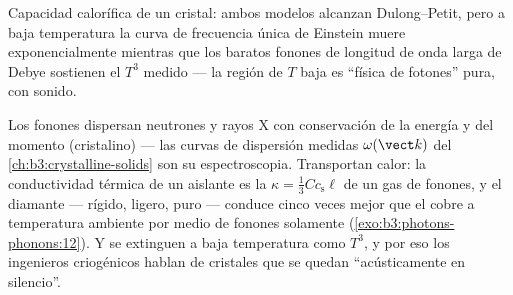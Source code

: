 \begin{omfigure}

{\small Capacidad calorífica de un cristal: ambos modelos alcanzan
Dulong--Petit, pero a baja temperatura la curva de frecuencia única de
Einstein muere exponencialmente mientras que los baratos fonones de longitud
de onda larga de Debye sostienen el $T^3$ medido --- la región de $T$ baja es
``física de fotones'' pura, con sonido.}
\end{omfigure}

\begin{example}\label{ex:b3:photons-phonons:phonon-real}
Los fonones dispersan neutrones y rayos X con conservación de la energía y del
momento (cristalino) --- las curvas de dispersión medidas
$\omega(\vect k)$ del \cref{ch:b3:crystalline-solids} son su
espectroscopia. Transportan calor: la conductividad térmica de un aislante
es la $\kappa = \tfrac13 Cc_{\text{s}}\ell$ de un gas de fonones, y
el diamante --- rígido, ligero, puro --- conduce cinco veces mejor que el cobre
a temperatura ambiente por medio de fonones solamente
(\cref{exo:b3:photons-phonons:12}). Y se extinguen a baja
temperatura como $T^3$, y por eso los ingenieros criogénicos hablan de
cristales que se quedan ``acústicamente en silencio''.
\end{example}

